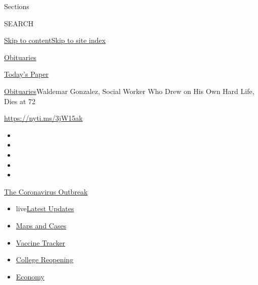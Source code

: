 Sections

SEARCH

\protect\hyperlink{site-content}{Skip to
content}\protect\hyperlink{site-index}{Skip to site index}

\href{https://www.nytimes.com/section/obituaries}{Obituaries}

\href{https://myaccount.nytimes.com/auth/login?response_type=cookie\&client_id=vi}{}

\href{https://www.nytimes.com/section/todayspaper}{Today's Paper}

\href{/section/obituaries}{Obituaries}\textbar{}Waldemar Gonzalez,
Social Worker Who Drew on His Own Hard Life, Dies at 72

\url{https://nyti.ms/3jW15ak}

\begin{itemize}
\item
\item
\item
\item
\item
\end{itemize}

\href{https://www.nytimes.com/news-event/coronavirus?action=click\&pgtype=Article\&state=default\&region=TOP_BANNER\&context=storylines_menu}{The
Coronavirus Outbreak}

\begin{itemize}
\tightlist
\item
  live\href{https://www.nytimes.com/2020/08/03/world/coronavirus-covid-19.html?action=click\&pgtype=Article\&state=default\&region=TOP_BANNER\&context=storylines_menu}{Latest
  Updates}
\item
  \href{https://www.nytimes.com/interactive/2020/us/coronavirus-us-cases.html?action=click\&pgtype=Article\&state=default\&region=TOP_BANNER\&context=storylines_menu}{Maps
  and Cases}
\item
  \href{https://www.nytimes.com/interactive/2020/science/coronavirus-vaccine-tracker.html?action=click\&pgtype=Article\&state=default\&region=TOP_BANNER\&context=storylines_menu}{Vaccine
  Tracker}
\item
  \href{https://www.nytimes.com/2020/08/02/us/covid-college-reopening.html?action=click\&pgtype=Article\&state=default\&region=TOP_BANNER\&context=storylines_menu}{College
  Reopening}
\item
  \href{https://www.nytimes.com/live/2020/08/03/business/stock-market-today-coronavirus?action=click\&pgtype=Article\&state=default\&region=TOP_BANNER\&context=storylines_menu}{Economy}
\end{itemize}

